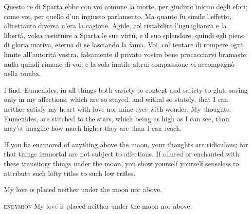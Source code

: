 \documentclass[a5paper,11pt]{book}
\def\testodicontrollo{%
Questo re di Sparta ebbe con voi comune la morte, per giudizio
iniquo degli efori; come voi, per quello d'un ingiusto parlamento.
Ma quanto fu simile l'effetto, altrettanto diversa n'era la
cagione. Agide, col ristabilire l'uguaglianza e la libertá, volea
restituire a Sparta le sue virtú, e il suo splendore; quindi egli
pieno di gloria moriva, eterna di se lasciando la fama. Voi, col
tentare di rompere ogni limite all'autoritá vostra, falsamente il
privato vostro bene procacciarvi bramaste: nulla quindi rimane di
voi; e la sola inutile altrui compassione vi accompagnò nella
tomba.
}
\begin{document}
\testodicontrollo

\begin{drama}
 I find, Eumenides, in all things both variety to
content and satiety to glut, saving only in my affections,
which are so stayed, and withal so stately, that I can
neither satisfy my heart with love nor mine eyes with
wonder. My thoughts, Eumenides, are stitched to the
stars, which being as high as I can see, thou may'st
imagine how much higher they are than I can reach.

 If you be enamored of anything above the
moon, your thoughts are ridiculous; for that things immortal
are not subject to affections. If allured or enchanted with
these transitory things under the moon, you show yourself
yourself senseless to attribute such lofty titles to such low
trifles.

 My love is placed neither under the moon nor
above.

\item[\scshape endymion] My love is placed neither under the moon nor
above.
\end{drama}
\end{document}
